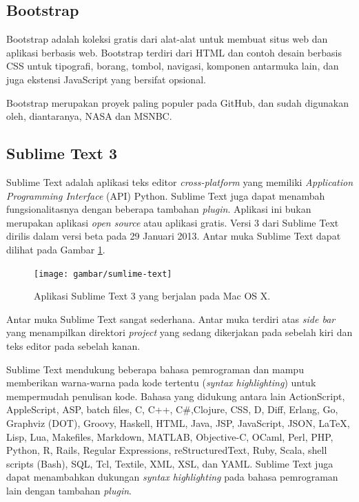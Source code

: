   \subsection{Bootstrap}
    Bootstrap adalah koleksi gratis dari alat-alat untuk membuat situs web dan aplikasi berbasis web. Bootstrap terdiri dari HTML dan contoh desain berbasis CSS untuk tipografi, borang, tombol, navigasi, komponen antarmuka lain, dan juga ekstensi JavaScript yang bersifat opsional.

    Bootstrap merupakan proyek paling populer pada GitHub, dan sudah digunakan oleh, diantaranya, NASA dan MSNBC.

  \subsection{Sublime Text 3}
    Sublime Text adalah aplikasi teks editor \emph{cross-platform} yang memiliki \emph{Application Programming Interface} (API) Python. Sublime Text juga dapat menambah fungsionalitasnya dengan beberapa tambahan \emph{plugin}. Aplikasi ini bukan merupakan aplikasi \emph{open source} atau aplikasi gratis. Versi 3 dari Sublime Text dirilis dalam versi beta pada 29 Januari 2013. Antar muka Sublime Text dapat dilihat pada Gambar \ref{sublime-text}.

      \begin{figure}[ht!]
        \centering
          \texttt{[image: gambar/sumlime-text]}
          \caption{Aplikasi Sublime Text 3 yang berjalan pada Mac OS X.}
          \label{sublime-text}
      \end{figure}
    
    Antar muka Sublime Text sangat sederhana. Antar muka terdiri atas \emph{side bar} yang menampilkan direktori \emph{project} yang sedang dikerjakan pada sebelah kiri dan teks editor pada sebelah kanan.

    Sublime Text mendukung beberapa bahasa pemrograman dan mampu memberikan warna-warna pada kode tertentu (\emph{syntax highlighting}) untuk mempermudah penulisan kode. Bahasa yang didukung antara lain ActionScript, AppleScript, ASP, batch files, C, C++, C#,Clojure, CSS, D, Diff, Erlang, Go, Graphviz (DOT), Groovy, Haskell, HTML, Java, JSP, JavaScript, JSON, LaTeX, Lisp, Lua, Makefiles, Markdown, MATLAB, Objective-C, OCaml, Perl, PHP, Python, R, Rails, Regular Expressions, reStructuredText, Ruby, Scala, shell scripts (Bash), SQL, Tcl, Textile, XML, XSL, dan YAML. Sublime Text juga dapat menambahkan dukungan \emph{syntax highlighting} pada bahasa pemrograman lain dengan tambahan \emph{plugin}.

